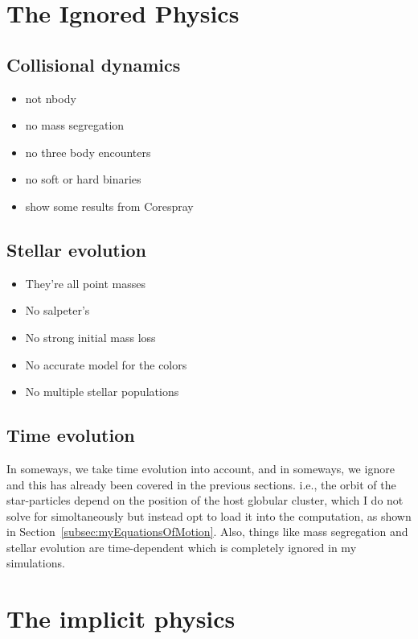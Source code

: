 \section{The Ignored Physics}
    \subsection{Collisional dynamics}
        \begin{itemize}
            \item not nbody
            \item no mass segregation
            \item no three body encounters 
            \item no soft or hard binaries 
            \item show some results from Corespray 
        \end{itemize}
    
    \subsection{Stellar evolution}
        \begin{itemize}
            \item They're all point masses 
            \item No salpeter's 
            \item No strong initial mass loss 
            \item No accurate model for the colors 
            \item No multiple stellar populations 
        \end{itemize}
    
    \subsection{Time evolution}
        In someways, we take time evolution into account, and in someways, we ignore and this has already been covered in the previous sections. i.e., the orbit of the star-particles depend on the position of the host globular cluster, which I do not solve for simoltaneously but instead opt to load it into the computation, as shown in Section~\ref{subsec:myEquationsOfMotion}. Also, things like mass segregation and stellar evolution are time-dependent which is completely ignored in my simulations. 

\section{The implicit physics}

